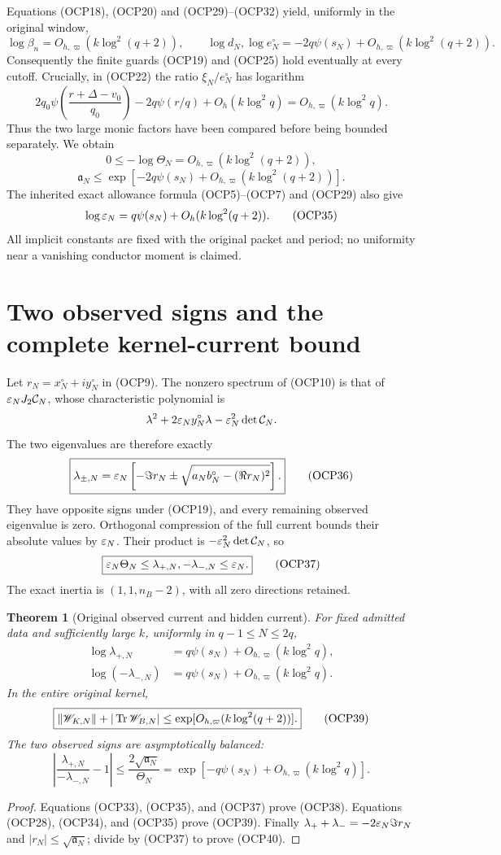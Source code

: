 \documentclass[10pt]{article}
\newtheorem{theorem}{Theorem}[section]
\begin{document}
Equations (OCP18), (OCP20) and (OCP29)--(OCP32) yield, uniformly in the original window,
\[
 \log\beta_n=O_{h,\varpi}(k\log^2(q+2)),\qquad
 \log d_N,\log e_N^{\circ}
 =-2q\psi(s_N)+O_{h,\varpi}(k\log^2(q+2)).
\]
Consequently the finite guards (OCP19) and (OCP25) hold eventually at every cutoff. Crucially, in (OCP22) the ratio $\xi_N/e_N^{\circ}$ has logarithm
\[
 2q_0\psi\left(\frac{r+\Delta-v_0}{q_0}\right)
 -2q\psi(r/q)+O_h(k\log^2q)
 =O_{h,\varpi}(k\log^2q).
\]
Thus the two large monic factors have been compared before being bounded separately. We obtain
\[
 \boxed{0\le-\log\Theta_N=O_{h,\varpi}(k\log^2(q+2)),}
 \tag{OCP33}
\]
\[
 \boxed{\mathfrak a_N\le
 \exp[-2q\psi(s_N)+O_{h,\varpi}(k\log^2(q+2))].}
 \tag{OCP34}
\]
The inherited exact allowance formula (OCP5)--(OCP7) and (OCP29) also give
\[
 \log\varepsilon_N=q\psi(s_N)+O_h(k\log^2(q+2)).
 \tag{OCP35}
\]
All implicit constants are fixed with the original packet and period; no uniformity near a vanishing conductor moment is claimed.

\section{Two observed signs and the complete kernel-current bound}
Let $r_N=x_N^{\circ}+iy_N^{\circ}$ in (OCP9). The nonzero spectrum of (OCP10) is that of $\varepsilon_NJ_2\mathcal C_N$, whose characteristic polynomial is
\[
 \lambda^2+2\varepsilon_Ny_N^{\circ}\lambda
 -\varepsilon_N^2\det\mathcal C_N.
\]
The two eigenvalues are therefore exactly
\[
 \boxed{\lambda_{\pm,N}=\varepsilon_N\left[
 -\Im r_N\pm\sqrt{a_Nb_N^{\circ}-(\Re r_N)^2}\right].}
 \tag{OCP36}
\]
They have opposite signs under (OCP19), and every remaining observed eigenvalue is zero. Orthogonal compression of the full current bounds their absolute values by $\varepsilon_N$. Their product is $-\varepsilon_N^2\det\mathcal C_N$, so
\[
 \boxed{\varepsilon_N\Theta_N\le\lambda_{+,N},-\lambda_{-,N}\le\varepsilon_N.}
 \tag{OCP37}
\]
The exact inertia is $(1,1,n_B-2)$, with all zero directions retained.

\begin{theorem}[Original observed current and hidden current]
For fixed admitted data and sufficiently large $k$, uniformly in $q-1\le N\le2q$,
\[
 \boxed{\begin{aligned}
 \log\lambda_{+,N}&=q\psi(s_N)+O_{h,\varpi}(k\log^2q),\\
 \log(-\lambda_{-,N})&=q\psi(s_N)+O_{h,\varpi}(k\log^2q).
 \end{aligned}}
 \tag{OCP38}
\]
In the entire original kernel,
\[
 \boxed{\left\lVert\mathscr W_{K,N}\right\rVert+|\operatorname{Tr}\mathscr W_{B,N}|
 \le\exp[O_{h,\varpi}(k\log^2(q+2))].}
 \tag{OCP39}
\]
The two observed signs are asymptotically balanced:
\[
 \left|\frac{\lambda_{+,N}}{-\lambda_{-,N}}-1\right|
 \le\frac{2\sqrt{\mathfrak a_N}}{\Theta_N}
 =\exp[-q\psi(s_N)+O_{h,\varpi}(k\log^2q)].
 \tag{OCP40}
\]
\end{theorem}
\begin{proof}
Equations (OCP33), (OCP35), and (OCP37) prove (OCP38). Equations (OCP28), (OCP34), and (OCP35) prove (OCP39). Finally $\lambda_++\lambda_-=-2\varepsilon_N\Im r_N$ and $|r_N|\le\sqrt{\mathfrak a_N}$; divide by (OCP37) to prove (OCP40).
\end{proof}
\end{document}

